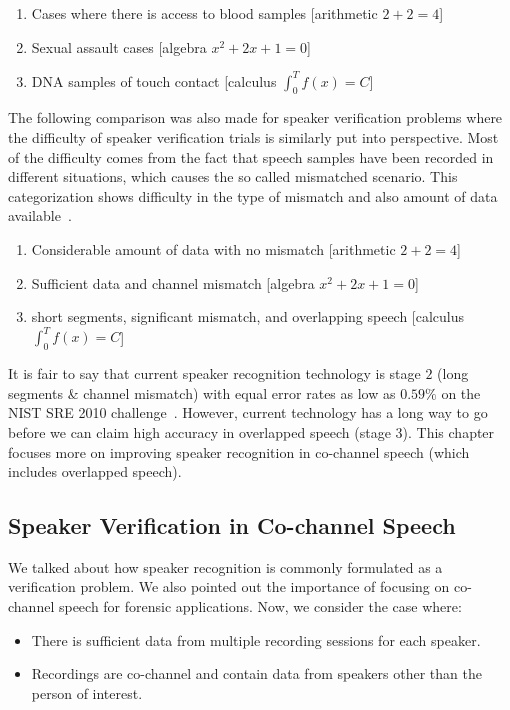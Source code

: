 \begin{enumerate}
	\item Cases where there is access to blood samples [arithmetic $2 + 2 = 4$]
	\item Sexual assault cases [algebra $x^2 + 2x + 1 = 0$]
	\item DNA samples of touch contact [calculus $\int_{0}^{T}f(x) = C$]
\end{enumerate}
The following comparison was also made for speaker verification problems where the difficulty of speaker verification trials is similarly put into perspective. 
Most of the difficulty comes from the fact that speech samples have been recorded in different situations, which causes the so called mismatched scenario. 
This categorization shows difficulty in the type of mismatch and also amount of data available~\cite{campbell2009forensic_findonline}. 

\begin{enumerate}
	\item Considerable amount of data with no mismatch [arithmetic $2 + 2 = 4$]
	\item Sufficient data and channel mismatch [algebra $x^2 + 2x + 1 = 0$]
	\item short segments, significant mismatch, and overlapping speech [calculus $\int_{0}^{T}f(x) = C$]
\end{enumerate}

It is fair to say that current speaker recognition technology is stage $2$ (long segments \& channel mismatch) with equal error rates as low as $0.59\%$ on the NIST SRE 2010 challenge~\cite{omid_IBM,hansen_taufiq}. 
However, current technology has a long way to go before we can claim high accuracy in overlapped speech (stage $3$). 
This chapter focuses more on improving speaker recognition in co-channel speech (which includes overlapped speech).

\subsection{Speaker Verification in Co-channel Speech}

We talked about how speaker recognition is commonly formulated as a verification problem. 
We also pointed out the importance of focusing on co-channel speech for forensic applications. 
Now, we consider the case where:
\begin{itemize}
	\item There is sufficient data from multiple recording sessions for each speaker. 
	\item Recordings are co-channel and contain data from speakers other than the person of interest.
\end{itemize} 

